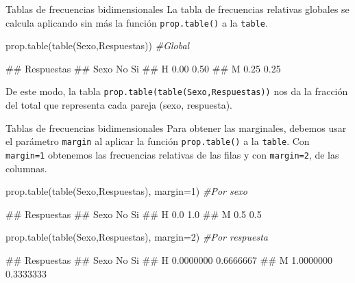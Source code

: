 \documentclass[
  ignorenonframetext,
  aspectratio=169]{beamer}
\newenvironment{Shaded}{\begin{snugshade}}{\end{snugshade}}
\newcommand{\AttributeTok}[1]{\textcolor[rgb]{0.77,0.63,0.00}{#1}}
\newcommand{\CommentTok}[1]{\textcolor[rgb]{0.56,0.35,0.01}{\textit{#1}}}
\newcommand{\DecValTok}[1]{\textcolor[rgb]{0.00,0.00,0.81}{#1}}
\newcommand{\FunctionTok}[1]{\textcolor[rgb]{0.00,0.00,0.00}{#1}}
\newcommand{\NormalTok}[1]{#1}
\let\oldverbatim\verbatim
\let\endoldverbatim\endverbatim
\renewenvironment{verbatim}{\tiny\oldverbatim}{\endoldverbatim}
\begin{document}
\begin{frame}[fragile]{Tablas de frecuencias bidimensionales}
\protect\hypertarget{tablas-de-frecuencias-bidimensionales-5}{}
La tabla de frecuencias relativas globales se calcula aplicando sin más
la función \texttt{prop.table()} a la \texttt{table}.

\begin{Shaded}
\begin{Highlighting}[]
\FunctionTok{prop.table}\NormalTok{(}\FunctionTok{table}\NormalTok{(Sexo,Respuestas)) }\CommentTok{\#Global}
\end{Highlighting}
\end{Shaded}

\begin{verbatim}
##     Respuestas
## Sexo   No   Si
##    H 0.00 0.50
##    M 0.25 0.25
\end{verbatim}

De este modo, la tabla \texttt{prop.table(table(Sexo,Respuestas))} nos
da la fracción del total que representa cada pareja (sexo, respuesta).
\end{frame}

\begin{frame}[fragile]{Tablas de frecuencias bidimensionales}
\protect\hypertarget{tablas-de-frecuencias-bidimensionales-6}{}
Para obtener las marginales, debemos usar el parámetro \texttt{margin}
al aplicar la función \texttt{prop.table()} a la \texttt{table}. Con
\texttt{margin=1} obtenemos las frecuencias relativas de las filas y con
\texttt{margin=2}, de las columnas.

\begin{Shaded}
\begin{Highlighting}[]
\FunctionTok{prop.table}\NormalTok{(}\FunctionTok{table}\NormalTok{(Sexo,Respuestas), }\AttributeTok{margin=}\DecValTok{1}\NormalTok{) }\CommentTok{\#Por sexo}
\end{Highlighting}
\end{Shaded}

\begin{verbatim}
##     Respuestas
## Sexo  No  Si
##    H 0.0 1.0
##    M 0.5 0.5
\end{verbatim}

\begin{Shaded}
\begin{Highlighting}[]
\FunctionTok{prop.table}\NormalTok{(}\FunctionTok{table}\NormalTok{(Sexo,Respuestas), }\AttributeTok{margin=}\DecValTok{2}\NormalTok{) }\CommentTok{\#Por respuesta}
\end{Highlighting}
\end{Shaded}

\begin{verbatim}
##     Respuestas
## Sexo        No        Si
##    H 0.0000000 0.6666667
##    M 1.0000000 0.3333333
\end{verbatim}
\end{frame}
\end{document}

